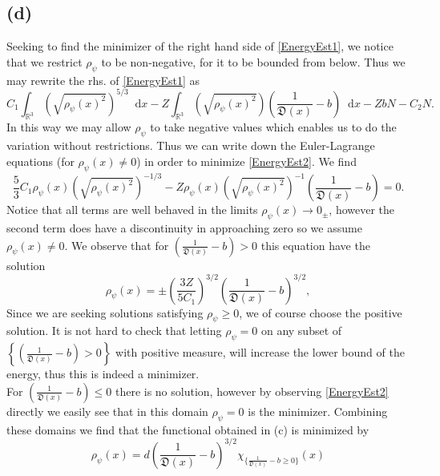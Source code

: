 \documentclass[a4paper,11pt]{article}
\newcommand*\diff{\mathop{}\!\mathrm{d}}
\newcommand{\R}{\mathbb{R}}
\numberwithin{equation}{section}
\begin{document}
 \subsection*{(d)}
 Seeking to find the minimizer of the right hand side of \eqref{EnergyEst1}, we notice that we restrict $ \rho_\psi $ to be non-negative, for it to be bounded from below. Thus we may rewrite the rhs. of \eqref{EnergyEst1} as 
 \begin{equation}
  C_1\int_{\R^3}\left(\sqrt{\rho_\psi(x)^2}\right)^{5/3}\diff x-Z\int_{\R^3}\left(\sqrt{\rho_\psi(x)^2}\right)\left(\frac{1}{\mathfrak{D}(x)}-b\right)\diff x-ZbN-C_2N.\label{EnergyEst2}
 \end{equation}
 In this way we may allow $ \rho_\psi $ to take negative values which enables us to do the variation without restrictions. Thus we can write down the Euler-Lagrange equations (for $ \rho_\psi(x)\neq0 $) in order to minimize \eqref{EnergyEst2}. We find \begin{equation}
 \frac{5}{3}C_1\rho_\psi(x)\left(\sqrt{\rho_\psi(x)^2}\right)^{-1/3}-Z\rho_\psi(x)\left(\sqrt{\rho_\psi(x)^2}\right)^{-1}\left(\frac{1}{\mathfrak{D}(x)}-b\right)=0.
 \end{equation} 
Notice that all terms are well behaved in the limits $ \rho_\psi(x)\to0_\pm $, however the second term does have a discontinuity in approaching zero so we assume $ \rho_\psi(x)\neq0 $. We observe that for $ \left(\frac{1}{\mathfrak{D}(x)}-b\right)>0 $ this equation have the solution \begin{equation}
 \rho_\psi(x)=\pm \left(\frac{3Z}{5C_1}\right)^{3/2}\left(\frac{1}{\mathfrak{D}(x)}-b\right)^{3/2},
 \end{equation}
Since we are seeking solutions satisfying $ \rho_\psi\geq0 $, we of course choose the positive solution. It is not hard to check that letting $ \rho_\psi=0 $ on any subset of $ \left\{\left(\frac{1}{\mathfrak{D}(x)}-b\right)>0\right\} $ with positive measure, will increase the lower bound of the energy, thus this is indeed a minimizer.\\
 For $ \left(\frac{1}{\mathfrak{D}(x)}-b\right)\leq0 $ there is no solution, however by observing \eqref{EnergyEst2} directly we easily see that in this domain $ \rho_\psi=0 $ is the minimizer. Combining these domains we find that the functional obtained in (c) is minimized by \begin{equation}
 \rho_{\psi}(x)=d\left(\frac{1}{\mathfrak{D}(x)}-b\right)^{3/2}\chi_{\{\frac{1}{\mathfrak{D}(x)}-b\geq 0\}}(x)
 \end{equation}
\end{document}
